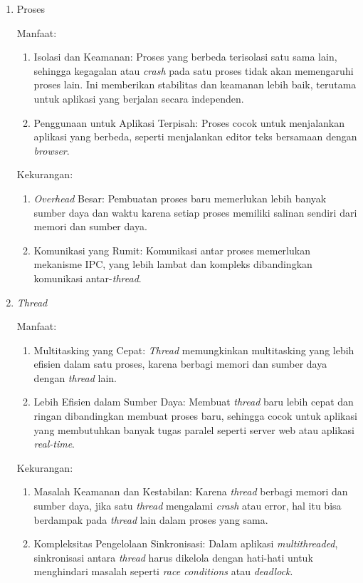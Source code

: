 \documentclass[12pt]{article}
\begin{document}
      \begin{enumerate}
          \item Proses

                Manfaat:
                \begin{enumerate}
                    \item Isolasi dan Keamanan: Proses yang berbeda terisolasi satu sama lain, sehingga kegagalan atau \textit{crash} pada satu proses tidak akan memengaruhi proses lain. Ini memberikan stabilitas dan keamanan lebih baik, terutama untuk aplikasi yang berjalan secara independen.
                    \item Penggunaan untuk Aplikasi Terpisah: Proses cocok untuk menjalankan aplikasi yang berbeda, seperti menjalankan editor teks bersamaan dengan \textit{browser}.
                \end{enumerate}
                Kekurangan:
                \begin{enumerate}
                    \item \textit{Overhead} Besar: Pembuatan proses baru memerlukan lebih banyak sumber daya dan waktu karena setiap proses memiliki salinan sendiri dari memori dan sumber daya.
                    \item Komunikasi yang Rumit: Komunikasi antar proses memerlukan mekanisme IPC, yang lebih lambat dan kompleks dibandingkan komunikasi antar-\textit{thread}.
                \end{enumerate}
          \item \textit{Thread}

                Manfaat:
                \begin{enumerate}
                    \item Multitasking yang Cepat: \textit{Thread} memungkinkan multitasking yang lebih efisien dalam satu proses, karena berbagi memori dan sumber daya dengan \textit{thread} lain.
                    \item Lebih Efisien dalam Sumber Daya: Membuat \textit{thread} baru lebih cepat dan ringan dibandingkan membuat proses baru, sehingga cocok untuk aplikasi yang membutuhkan banyak tugas paralel seperti server web atau aplikasi \textit{real-time}.
                \end{enumerate}

                Kekurangan:
                \begin{enumerate}
                    \item Masalah Keamanan dan Kestabilan: Karena \textit{thread} berbagi memori dan sumber daya, jika satu \textit{thread} mengalami \textit{crash} atau error, hal itu bisa berdampak pada \textit{thread} lain dalam proses yang sama.
                    \item Kompleksitas Pengelolaan Sinkronisasi: Dalam aplikasi \textit{multithreaded}, sinkronisasi antara \textit{thread} harus dikelola dengan hati-hati untuk menghindari masalah seperti \textit{race conditions} atau \textit{deadlock}.
                \end{enumerate}
      \end{enumerate}
\end{document}
